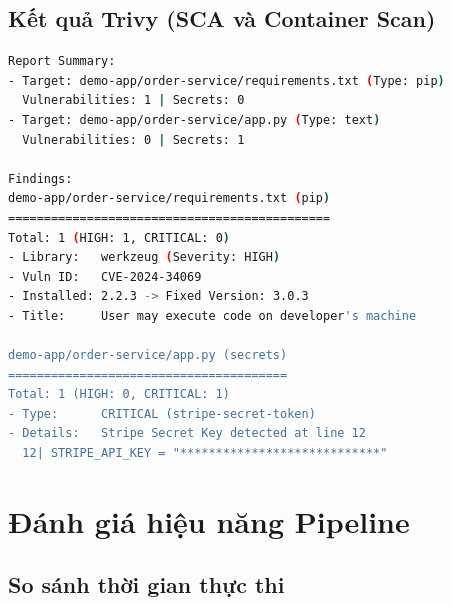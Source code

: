 \documentclass[12pt,a4paper]{report}
\begin{document}
\subsection{Kết quả Trivy (SCA và Container Scan)}

\begin{lstlisting}[language=bash, caption={Kết quả quét SCA thực tế của Trivy trên GitHub Actions}]
Report Summary:
- Target: demo-app/order-service/requirements.txt (Type: pip)
  Vulnerabilities: 1 | Secrets: 0
- Target: demo-app/order-service/app.py (Type: text)
  Vulnerabilities: 0 | Secrets: 1

Findings:
demo-app/order-service/requirements.txt (pip)
=============================================
Total: 1 (HIGH: 1, CRITICAL: 0)
- Library:   werkzeug (Severity: HIGH)
- Vuln ID:   CVE-2024-34069
- Installed: 2.2.3 -> Fixed Version: 3.0.3
- Title:     User may execute code on developer's machine

demo-app/order-service/app.py (secrets)
=======================================
Total: 1 (HIGH: 0, CRITICAL: 1)
- Type:      CRITICAL (stripe-secret-token)
- Details:   Stripe Secret Key detected at line 12
  12| STRIPE_API_KEY = "****************************"
\end{lstlisting}

\section{Đánh giá hiệu năng Pipeline}

\subsection{So sánh thời gian thực thi}

\begin{table}[H]
\centering
\caption{So sánh thời gian thực thi Pipeline: Tuần tự vs. Song song (có Cache)}
\label{tab:performance-comparison}
\end{table}
\end{document}
